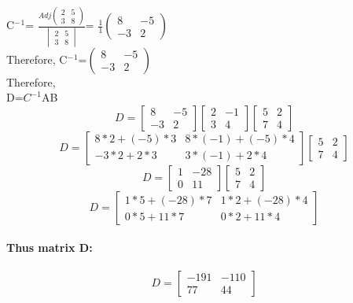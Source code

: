 \documentclass[a4paper,12pt]{article}
\begin{document}
C$^-$$^1$= $\frac{ Adj\begin{pmatrix} 2 & 5  \\ 3 & 8 \end{pmatrix} }{\begin{vmatrix} 2 & 5  \\ 3 & 8 \end{vmatrix}}$= $\frac{1}{1}$$\begin{pmatrix} 8 & -5  \\ -3 & 2 \end{pmatrix}$\\

Therefore,   C$^-$$^1$=$\begin{pmatrix} 8 & -5  \\ -3 & 2 \end{pmatrix}$\\
Therefore,\\
D=$C^{-1}$AB\\
\begin{equation}
	D=\begin{bmatrix}
		8 & -5\\
		-3 & 2
	\end{bmatrix} \begin{bmatrix}
		2 & -1\\
		3 & 4
	\end{bmatrix} \begin{bmatrix}
		5 & 2\\
		7 & 4
	\end{bmatrix} 
\end{equation}
\begin{equation}
	D=\begin{bmatrix}
	    8*2+(-5)*3 & 8*(-1)+(-5)*4\\
		-3*2+2*3  & 3*(-1)+2*4
	\end{bmatrix} \begin{bmatrix}
	5 & 2\\
	7 & 4
\end{bmatrix}
\end{equation}
\begin{equation}
	D=\begin{bmatrix}
		1 & -28\\
		0  & 11
	\end{bmatrix} \begin{bmatrix}
		5 & 2\\
		7 & 4
	\end{bmatrix}
\end{equation}
\[D=\begin{bmatrix}
	1*5+(-28)*7 & 1*2+(-28)*4\\
	0*5+11*7 &  0*2+11*4
\end{bmatrix}\]
\paragraph{Thus matrix D:}
\[D=\begin{bmatrix}
	-191 & -110\\
	 77 &  44
\end{bmatrix}\]
\end{document}
